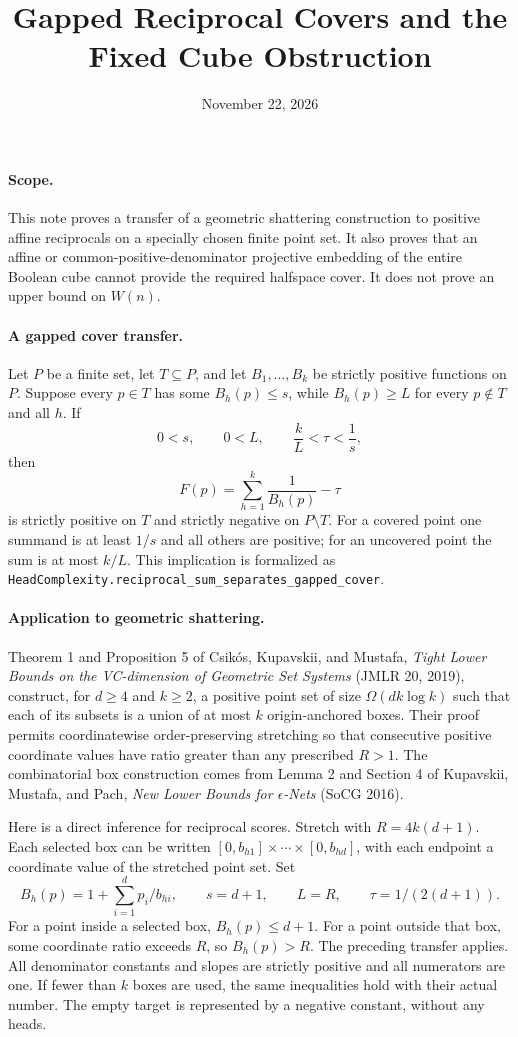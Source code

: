 \documentclass[11pt]{article}
\title{Gapped Reciprocal Covers and the Fixed Cube Obstruction}
\author{}
\date{November 22, 2026}
\begin{document}
\maketitle

\paragraph{Scope.}
This note proves a transfer of a geometric shattering construction to
positive affine reciprocals on a specially chosen finite point set.
It also proves that an affine or common-positive-denominator projective
embedding of the entire Boolean cube cannot provide the required
halfspace cover. It does not prove an upper bound on $W(n)$.

\paragraph{A gapped cover transfer.}
Let $P$ be a finite set, let $T\subseteq P$, and let $B_1,\ldots,B_k$
be strictly positive functions on $P$. Suppose every $p\in T$ has
some $B_h(p)\le s$, while $B_h(p)\ge L$ for every $p\notin T$ and
all $h$. If
\[
 0<s,\qquad 0<L,\qquad \frac{k}{L}<\tau<\frac1s,
\]
then
\[
 F(p)=\sum_{h=1}^k\frac1{B_h(p)}-\tau
\]
is strictly positive on $T$ and strictly negative on $P\setminus T$.
For a covered point one summand is at least $1/s$ and all others
are positive; for an uncovered point the sum is at most $k/L$.
This implication is formalized as
\texttt{HeadComplexity.reciprocal\_sum\_separates\_gapped\_cover}.

\paragraph{Application to geometric shattering.}
Theorem 1 and Proposition 5 of Csik\'os, Kupavskii, and Mustafa,
\emph{Tight Lower Bounds on the VC-dimension of Geometric Set Systems}
(JMLR 20, 2019), construct, for $d\ge4$ and $k\ge2$, a positive
point set of size $\Omega(dk\log k)$ such that each of its subsets is
a union of at most $k$ origin-anchored boxes. Their proof permits
coordinatewise order-preserving stretching so that consecutive
positive coordinate values have ratio greater than any prescribed
$R>1$. The combinatorial box construction comes from Lemma 2 and
Section 4 of Kupavskii, Mustafa, and Pach, \emph{New Lower Bounds for
$\epsilon$-Nets} (SoCG 2016).

Here is a direct inference for reciprocal scores. Stretch with
$R=4k(d+1)$. Each selected box can be written
$[0,b_{h1}]\times\cdots\times[0,b_{hd}]$, with each endpoint a
coordinate value of the stretched point set. Set
\[
 B_h(p)=1+\sum_{i=1}^d p_i/b_{hi},\qquad
 s=d+1,\qquad L=R,\qquad \tau=1/(2(d+1)).
\]
For a point inside a selected box, $B_h(p)\le d+1$.
For a point outside that box, some coordinate ratio exceeds $R$,
so $B_h(p)>R$. The preceding transfer applies. All denominator
constants and slopes are strictly positive and all numerators are
one. If fewer than $k$ boxes are used, the same inequalities hold
with their actual number. The empty target is represented by a
negative constant, without any heads.
\end{document}
